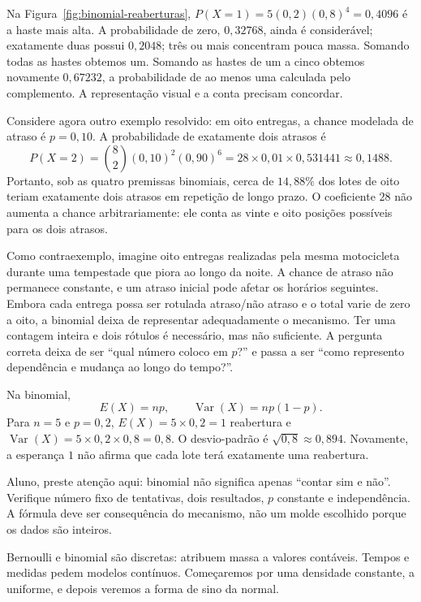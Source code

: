 Na Figura~\ref{fig:binomial-reaberturas}, $P(X=1)=5(0{,}2)(0{,}8)^4=0{,}4096$ é a haste mais alta. A probabilidade de zero, $0{,}32768$, ainda é considerável; exatamente duas possui $0{,}2048$; três ou mais concentram pouca massa. Somando todas as hastes obtemos um. Somando as hastes de um a cinco obtemos novamente $0{,}67232$, a probabilidade de ao menos uma calculada pelo complemento. A representação visual e a conta precisam concordar.

Considere agora outro exemplo resolvido: em oito entregas, a chance modelada de atraso é $p=0{,}10$. A probabilidade de exatamente dois atrasos é
\[
P(X=2)=\binom82(0{,}10)^2(0{,}90)^6=28\times0{,}01\times0{,}531441\approx0{,}1488.
\]
Portanto, sob as quatro premissas binomiais, cerca de $14{,}88\%$ dos lotes de oito teriam exatamente dois atrasos em repetição de longo prazo. O coeficiente $28$ não aumenta a chance arbitrariamente: ele conta as vinte e oito posições possíveis para os dois atrasos.

Como contraexemplo, imagine oito entregas realizadas pela mesma motocicleta durante uma tempestade que piora ao longo da noite. A chance de atraso não permanece constante, e um atraso inicial pode afetar os horários seguintes. Embora cada entrega possa ser rotulada atraso/não atraso e o total varie de zero a oito, a binomial deixa de representar adequadamente o mecanismo. Ter uma contagem inteira e dois rótulos é necessário, mas não suficiente. A pergunta correta deixa de ser ``qual número coloco em $p$?'' e passa a ser ``como represento dependência e mudança ao longo do tempo?''.

Na binomial,
\[
E(X)=np,
\qquad
\operatorname{Var}(X)=np(1-p).
\]
Para $n=5$ e $p=0{,}2$, $E(X)=5\times0{,}2=1$ reabertura e $\operatorname{Var}(X)=5\times0{,}2\times0{,}8=0{,}8$. O desvio-padrão é $\sqrt{0{,}8}\approx0{,}894$. Novamente, a esperança $1$ não afirma que cada lote terá exatamente uma reabertura.

\begin{GuidedBox}
Aluno, preste atenção aqui: binomial não significa apenas ``contar sim e não''. Verifique número fixo de tentativas, dois resultados, $p$ constante e independência. A fórmula deve ser consequência do mecanismo, não um molde escolhido porque os dados são inteiros.
\end{GuidedBox}

Bernoulli e binomial são discretas: atribuem massa a valores contáveis. Tempos e medidas pedem modelos contínuos. Começaremos por uma densidade constante, a uniforme, e depois veremos a forma de sino da normal.

